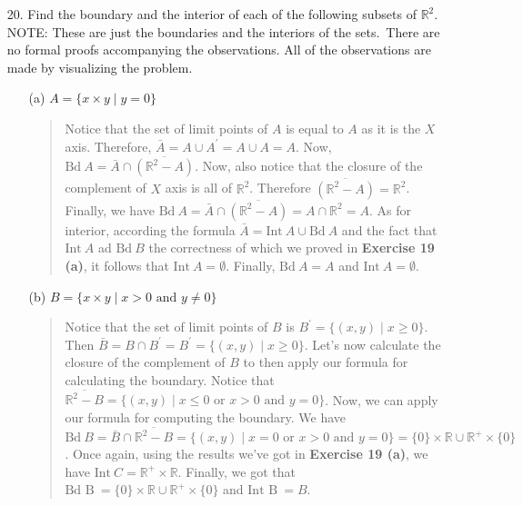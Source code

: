 \documentclass[12pt, a4paper]{article}
\newcommand{\reals}{\mathbb{R}} %
\newcommand{\preals}{\mathbb{R}^+} %
\begin{document}
\begin{itemize}
\item[]
\item[]

\item[20.]
Find the boundary and the interior of each of the following subsets of $\reals^2$.
\newline
\newline
NOTE: These are just the boundaries and the interiors of the sets.\ There are no formal proofs accompanying the observations.
All of the observations are made by visualizing the problem.
\begin{itemize}
\item[(a)]
$A = \{x \times y \mid y = 0\}$
\begin{quote}
Notice that the set of limit points of $A$ is equal to $A$
as it is the $X$ axis. Therefore, $\bar{A} = A \cup A^\prime = A \cup A = A$. Now,
$\mbox{Bd} \ A = \bar{A} \cap \overline{(\reals^2 - A)}$. Now, also
notice that the closure of the complement of $X$ axis is all of $\reals^2$.
Therefore $\overline{(\reals^2 - A)} = \reals^2$. Finally, we have $\mbox{Bd} \ A = \bar{A} \cap \overline{(\reals^2 - A)} = A \cap \reals^2 = A$.
As for interior, according the formula $\bar{A} = \mbox{Int} \ A \cup \mbox{Bd} \ A$ and the fact that $\mbox{Int} \ A$ ad $\mbox{Bd} \ B$
the correctness of which we proved in \textbf{Exercise 19 (a)}, it follows that $\mbox{Int} \ A = \emptyset$.
Finally, $\mbox{Bd} \ A = A$ and $\mbox{Int} \ A = \emptyset$.
\end{quote}

\item[]
\item[]

\item[(b)]
$B = \{x \times y \mid x > 0 \mbox{ and } y \neq 0\}$
\begin{quote}
Notice that the set of limit points of $B$ is $B^\prime = \{(x, y) \mid x \geq 0\}$.
Then $\bar{B} = B \cap B^\prime = B^\prime = \{(x, y) \mid x \geq 0\}$.
Let's now calculate the closure of the complement of $B$ to then apply our formula for calculating the boundary.
Notice that $\overline{\reals^2 - B} = \{(x, y) \mid x \leq 0 \mbox{ or } x > 0 \mbox{ and } y = 0\}$.
Now, we can apply our formula for computing the boundary.
We have $\mbox{Bd} \ B = \bar{B} \cap \overline{\reals^2 - B} = \{(x, y) \mid x = 0 \mbox{ or } x > 0 \mbox{ and } y = 0\} = \{0\} \times \reals \cup \preals \times \{0\}$.
Once again, using the results we've got in \textbf{Exercise 19 (a)}, we have $\mbox{Int} \ C = \preals \times \reals$.
Finally, we got that $\mbox{Bd B} \ = \{0\} \times \reals \cup \preals \times \{0\}$ and $\mbox{Int B} \ = B$.
\end{quote}


\end{itemize}
\end{itemize}
\end{document}
